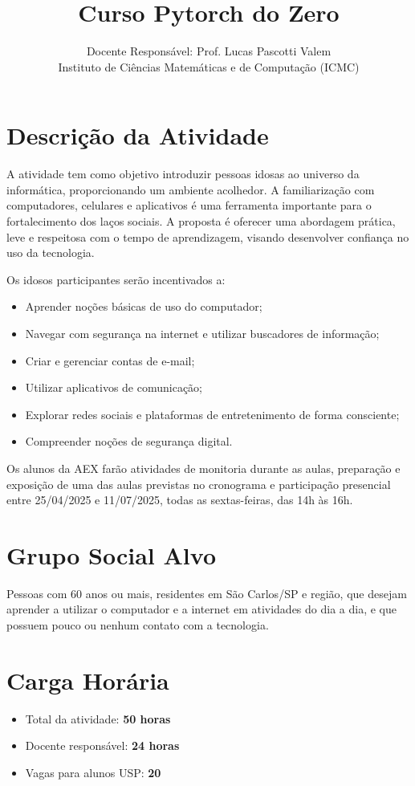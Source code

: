 \documentclass[a4paper,12pt]{article}
\title{Curso Pytorch do Zero}
\author{Docente Responsável: Prof. Lucas Pascotti Valem\\
Instituto de Ciências Matemáticas e de Computação (ICMC)}
\date{}
\begin{document}
\maketitle

\section*{Descrição da Atividade}
A atividade tem como objetivo introduzir pessoas idosas ao universo da informática, proporcionando um ambiente acolhedor. A familiarização com computadores, celulares e aplicativos é uma ferramenta importante para o fortalecimento dos laços sociais. A proposta é oferecer uma abordagem prática, leve e respeitosa com o tempo de aprendizagem, visando desenvolver confiança no uso da tecnologia.

Os idosos participantes serão incentivados a:
\begin{itemize}
    \item Aprender noções básicas de uso do computador;
    \item Navegar com segurança na internet e utilizar buscadores de informação;
    \item Criar e gerenciar contas de e-mail;
    \item Utilizar aplicativos de comunicação;
    \item Explorar redes sociais e plataformas de entretenimento de forma consciente;
    \item Compreender noções de segurança digital.
\end{itemize}

Os alunos da AEX farão atividades de monitoria durante as aulas, preparação e exposição de uma das aulas previstas no cronograma e participação presencial entre 25/04/2025 e 11/07/2025, todas as sextas-feiras, das 14h às 16h.

\section*{Grupo Social Alvo}
Pessoas com 60 anos ou mais, residentes em São Carlos/SP e região, que desejam aprender a utilizar o computador e a internet em atividades do dia a dia, e que possuem pouco ou nenhum contato com a tecnologia.

\section*{Carga Horária}
\begin{itemize}
    \item Total da atividade: \textbf{50 horas}
    \item Docente responsável: \textbf{24 horas}
    \item Vagas para alunos USP: \textbf{20}
\end{itemize}
\end{document}
